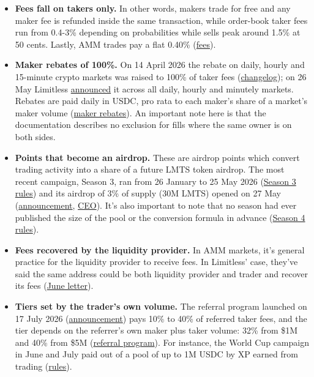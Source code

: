 \documentclass[11pt]{article}
\begin{document}
\begin{itemize}
\item \textbf{Fees fall on takers only.} In other words, makers trade for free and any maker fee is refunded inside the same transaction, while order-book taker fees run from 0.4-3\% depending on probabilities while sells peak around 1.5\% at 50 cents.
Lastly, AMM trades pay a flat 0.40\% (\href{https://docs.limitless.exchange/user-guide/fees}{fees}).
\item \textbf{Maker rebates of 100\%.} On 14 April 2026 the rebate on daily, hourly and 15-minute crypto markets was raised to 100\% of taker fees (\href{https://docs.limitless.exchange/changelog}{changelog}); on 26 May Limitless \href{https://x.com/trylimitless/status/2059222764553413019}{announced} it across all daily, hourly and minutely markets.
Rebates are paid daily in USDC, pro rata to each maker's share of a market's maker volume (\href{https://docs.limitless.exchange/user-guide/maker-rebates}{maker rebates}).
An important note here is that the documentation describes no exclusion for fills where the same owner is on both sides.
\item \textbf{Points that become an airdrop.} These are airdrop points which convert trading activity into a share of a future LMTS token airdrop.
The most recent campaign, Season 3, ran from 26 January to 25 May 2026 (\href{https://limitless.exchange/blog/points-announcement}{Season 3 rules}) and its airdrop of 3\% of supply (30M LMTS) opened on 27 May (\href{https://x.com/trylimitless/status/2059605695989698701}{announcement}, \href{https://x.com/cjhtech/status/2059653295556169781}{CEO}).
It's also important to note that no season had ever published the size of the pool or the conversion formula in advance (\href{https://limitless.exchange/blog/points-season-4-announcement}{Season 4 rules}).
\item \textbf{Fees recovered by the liquidity provider.} In AMM markets, it's general practice for the liquidity provider to receive fees.
In Limitless' case, they've said the same address could be both liquidity provider and trader and recover its fees (\href{https://limitless.exchange/blog/the-huddle-issue-01-jun-30th}{June letter}).
\item \textbf{Tiers set by the trader's own volume.} The referral program launched on 17 July 2026 (\href{https://x.com/trylimitless/status/2078153755472884068}{announcement}) pays 10\% to 40\% of referred taker fees, and the tier depends on the referrer's own maker plus taker volume: 32\% from \$1M and 40\% from \$5M (\href{https://docs.limitless.exchange/user-guide/referral-program}{referral program}).
For instance, the World Cup campaign in June and July paid out of a pool of up to 1M USDC by XP earned from trading (\href{https://cdn.limitless.exchange/road-to-legend/rules.pdf}{rules}).
\end{itemize}
\end{document}
